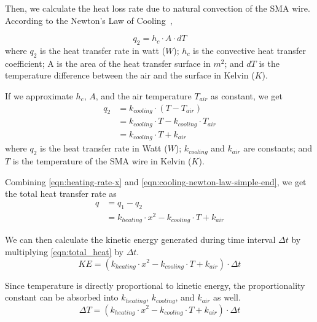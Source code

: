 Then, we calculate the heat loss rate due to natural convection of the SMA wire. According to the Newton's Law of Cooling~\cite{NewtonLawOfCooling}, 

\begin{equation}\label{eqn:cooling-newton-law}
q_2 = h_c \cdot A \cdot dT
\end{equation}
where $q_2$ is the heat transfer rate in watt ($W$); $h_c$ is the convective heat transfer coefficient; A is the area of the heat transfer surface in $m^2$; and $dT$ is the temperature difference between the air and the surface in Kelvin ($K$).

If we approximate $h_c$, $A$, and the air temperature $T_{air}$ as constant, we get
\begin{subequations}\label{eqn:cooling-newton-law-simple}
	\begin{flalign}
		q_2 &= k_{cooling} \cdot (T - T_{air}) \\
			&= k_{cooling} \cdot T - k_{cooling} \cdot T_{air} \\
			&= k_{cooling} \cdot T + k_{air}\label{eqn:cooling-newton-law-simple-end}
	\end{flalign}
\end{subequations}
where $q_2$ is the heat transfer rate in Watt ($W$); $k_{cooling}$ and $k_{air}$ are constants; and $T$ is the temperature of the SMA wire in Kelvin ($K$).

Combining \eqref{eqn:heating-rate-x} and \eqref{eqn:cooling-newton-law-simple-end}, we get the total heat transfer rate as 
\begin{subequations}
	\begin{flalign}
		q &= q_1 - q_2 \\
		  &= k_{heating} \cdot x^2 - k_{cooling} \cdot T + k_{air}\label{eqn:total_heat}
	\end{flalign}
\end{subequations}

We can then calculate the kinetic energy generated during time interval $\Delta t$ by multiplying \eqref{eqn:total_heat} by $\Delta t$.
\begin{equation}
	KE =  (k_{heating} \cdot x^2 - k_{cooling} \cdot T + k_{air}) \cdot \Delta t \label{eqn:total_KE}
\end{equation}

Since temperature is directly proportional to kinetic energy, the proportionality constant can be absorbed into $k_{heating}$, $k_{cooling}$, and $ k_{air}$ as well. 
\begin{equation}
	\Delta T =  (k_{heating} \cdot x^2 - k_{cooling} \cdot T  + k_{air}) \cdot \Delta t\label{eqn:delta_T}
\end{equation}

